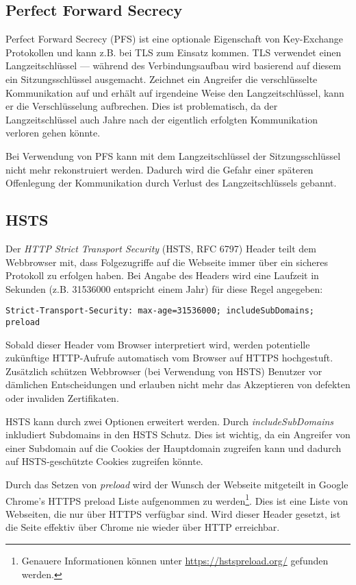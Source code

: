 \subsection{Perfect Forward Secrecy}

Perfect Forward Secrecy (PFS) ist eine optionale Eigenschaft von Key-Exchange Protokollen und kann z.B. bei TLS zum Einsatz kommen. TLS verwendet einen Langzeitschlüssel --- während des Verbindungsaufbau wird basierend auf diesem ein Sitzungsschlüssel ausgemacht. Zeichnet ein Angreifer die verschlüsselte Kommunikation auf und erhält auf irgendeine Weise den Langzeitschlüssel, kann er die Verschlüsselung aufbrechen. Dies ist problematisch, da der Langzeitschlüssel auch Jahre nach der eigentlich erfolgten Kommunikation verloren gehen könnte.

Bei Verwendung von PFS kann mit dem Langzeitschlüssel der Sitzungsschlüssel nicht mehr rekonstruiert werden. Dadurch wird die Gefahr einer späteren Offenlegung der Kommunikation durch Verlust des Langzeitschlüssels gebannt.

\subsection{HSTS}
\label{hsts}

Der \textit{HTTP Strict Transport Security} (HSTS, RFC 6797) Header teilt dem Webbrowser mit, dass Folgezugriffe auf die Webseite immer über ein sicheres Protokoll zu erfolgen haben. Bei Angabe des Headers wird eine Laufzeit in Sekunden (z.B. 31536000 entspricht einem Jahr) für diese Regel angegeben:

\begin{verbatim}
Strict-Transport-Security: max-age=31536000; includeSubDomains; preload
\end{verbatim}

Sobald dieser Header vom Browser interpretiert wird, werden potentielle zukünftige HTTP-Aufrufe automatisch vom Browser auf HTTPS hochgestuft. Zusätzlich schützen Webbrowser (bei Verwendung von HSTS) Benutzer vor dämlichen Entscheidungen und erlauben nicht mehr das Akzeptieren von defekten oder invaliden Zertifikaten.

HSTS kann durch zwei Optionen erweitert werden. Durch \textit{includeSubDomains} inkludiert Subdomains in den HSTS Schutz. Dies ist wichtig, da ein Angreifer von einer Subdomain auf die Cookies der Hauptdomain zugreifen kann und dadurch auf HSTS-geschützte Cookies zugreifen könnte.

Durch das Setzen von \textit{preload} wird der Wunsch der Webseite mitgeteilt in Google Chrome's HTTPS preload Liste aufgenommen zu werden\footnote{Genauere Informationen können unter \url{https://hstspreload.org/} gefunden werden.}. Dies ist eine Liste von Webseiten, die nur über HTTPS verfügbar sind. Wird dieser Header gesetzt, ist die Seite effektiv über Chrome nie wieder über HTTP erreichbar.

